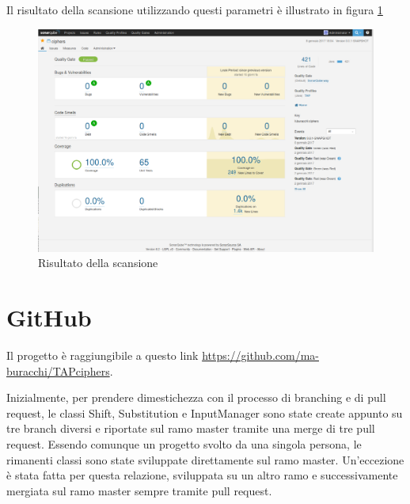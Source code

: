 		Il risultato della scansione utilizzando questi parametri è illustrato in figura \ref{fig:sonaresult}
		
		\begin{figure}[h]
			\centering
			\includegraphics[scale=0.3]{img/sonaresult}
			\caption{Risultato della scansione}
			\label{fig:sonaresult}
		\end{figure}
		
	\section{GitHub}
		Il progetto è raggiungibile a questo link \underline{https://github.com/ma-buracchi/TAPciphers}. 
		
		Inizialmente, per prendere dimestichezza con il processo di branching e di pull request, le classi Shift, Substitution e InputManager sono state create appunto su tre branch diversi e riportate sul ramo master tramite una merge di tre pull request. Essendo comunque un progetto svolto da una singola persona, le rimanenti classi sono state sviluppate direttamente sul ramo master. Un'eccezione è stata fatta per questa relazione, sviluppata su un altro ramo e successivamente mergiata sul ramo master sempre tramite pull request.
		
		
		